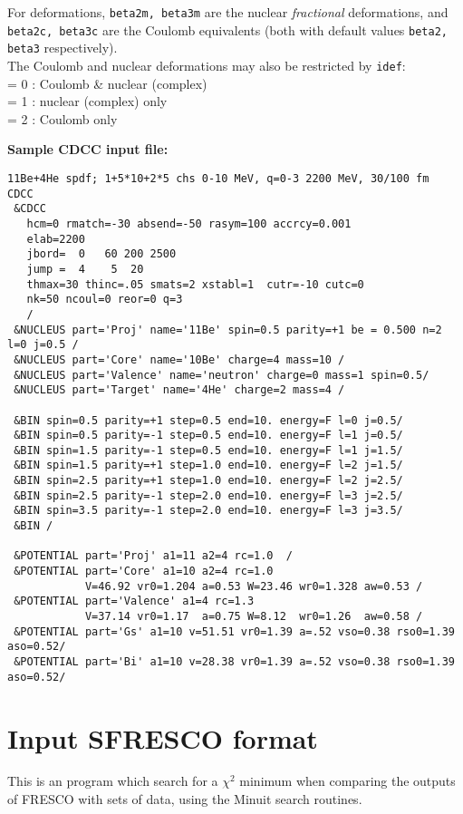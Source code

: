 \documentclass[11pt]{article}
\begin{document}
For deformations, {\tt beta2m, beta3m} are the nuclear {\em fractional}
deformations, and {\tt beta2c, beta3c} are the Coulomb equivalents (both with default
values  {\tt beta2, beta3} respectively).\\
The Coulomb and nuclear deformations may also be restricted by {\tt idef}:
\\   = 0 : Coulomb \& nuclear (complex)
\\  = 1 : nuclear (complex) only
\\  = 2 : Coulomb only


{\bf Sample CDCC input file:}
\begin{verbatim}
11Be+4He spdf; 1+5*10+2*5 chs 0-10 MeV, q=0-3 2200 MeV, 30/100 fm
CDCC
 &CDCC
   hcm=0 rmatch=-30 absend=-50 rasym=100 accrcy=0.001
   elab=2200
   jbord=  0   60 200 2500
   jump =  4    5  20
   thmax=30 thinc=.05 smats=2 xstabl=1  cutr=-10 cutc=0
   nk=50 ncoul=0 reor=0 q=3
   /
 &NUCLEUS part='Proj' name='11Be' spin=0.5 parity=+1 be = 0.500 n=2 l=0 j=0.5 /
 &NUCLEUS part='Core' name='10Be' charge=4 mass=10 /
 &NUCLEUS part='Valence' name='neutron' charge=0 mass=1 spin=0.5/
 &NUCLEUS part='Target' name='4He' charge=2 mass=4 /

 &BIN spin=0.5 parity=+1 step=0.5 end=10. energy=F l=0 j=0.5/
 &BIN spin=0.5 parity=-1 step=0.5 end=10. energy=F l=1 j=0.5/
 &BIN spin=1.5 parity=-1 step=0.5 end=10. energy=F l=1 j=1.5/
 &BIN spin=1.5 parity=+1 step=1.0 end=10. energy=F l=2 j=1.5/
 &BIN spin=2.5 parity=+1 step=1.0 end=10. energy=F l=2 j=2.5/
 &BIN spin=2.5 parity=-1 step=2.0 end=10. energy=F l=3 j=2.5/
 &BIN spin=3.5 parity=-1 step=2.0 end=10. energy=F l=3 j=3.5/
 &BIN /

 &POTENTIAL part='Proj' a1=11 a2=4 rc=1.0  /
 &POTENTIAL part='Core' a1=10 a2=4 rc=1.0
            V=46.92 vr0=1.204 a=0.53 W=23.46 wr0=1.328 aw=0.53 /
 &POTENTIAL part='Valence' a1=4 rc=1.3
            V=37.14 vr0=1.17  a=0.75 W=8.12  wr0=1.26  aw=0.58 /
 &POTENTIAL part='Gs' a1=10 v=51.51 vr0=1.39 a=.52 vso=0.38 rso0=1.39 aso=0.52/
 &POTENTIAL part='Bi' a1=10 v=28.38 vr0=1.39 a=.52 vso=0.38 rso0=1.39 aso=0.52/
\end{verbatim}
\newpage
\section{Input SFRESCO format}

This is an program which search for a $\chi^2$ minimum when comparing
the outputs of FRESCO with sets of data, using the {\sc Minuit} search
routines.
\end{document}
